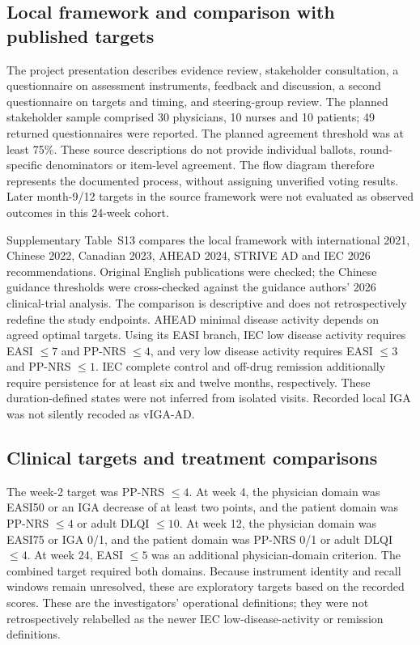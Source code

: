 \documentclass[10pt,a4paper]{article}
\begin{document}
\subsection{Local framework and comparison with published targets}
The project presentation describes evidence review, stakeholder consultation, a questionnaire on assessment instruments, feedback and discussion, a second questionnaire on targets and timing, and steering-group review. The planned stakeholder sample comprised 30 physicians, 10 nurses and 10 patients; 49 returned questionnaires were reported. The planned agreement threshold was at least 75\%. These source descriptions do not provide individual ballots, round-specific denominators or item-level agreement. The flow diagram therefore represents the documented process, without assigning unverified voting results. Later month-9/12 targets in the source framework were not evaluated as observed outcomes in this 24-week cohort.

Supplementary Table~S13 compares the local framework with international 2021, Chinese 2022, Canadian 2023, AHEAD 2024, STRIVE AD and IEC 2026 recommendations. Original English publications were checked; the Chinese guidance thresholds were cross-checked against the guidance authors' 2026 clinical-trial analysis.\citep{debruin2021t2t,zhao2022chinat2t,zhao2026t2t,yeung2023t2t,silverberg2024ahead,gkini2026strive,merola2026iec} The comparison is descriptive and does not retrospectively redefine the study endpoints. AHEAD minimal disease activity depends on agreed optimal targets. Using its EASI branch, IEC low disease activity requires EASI $\leq7$ and PP-NRS $\leq4$, and very low disease activity requires EASI $\leq3$ and PP-NRS $\leq1$. IEC complete control and off-drug remission additionally require persistence for at least six and twelve months, respectively. These duration-defined states were not inferred from isolated visits. Recorded local IGA was not silently recoded as vIGA-AD.

\subsection{Clinical targets and treatment comparisons}
The week-2 target was PP-NRS $\leq4$. At week 4, the physician domain was EASI50 or an IGA decrease of at least two points, and the patient domain was PP-NRS $\leq4$ or adult DLQI $\leq10$. At week 12, the physician domain was EASI75 or IGA 0/1, and the patient domain was PP-NRS 0/1 or adult DLQI $\leq4$. At week 24, EASI $\leq5$ was an additional physician-domain criterion. The combined target required both domains. Because instrument identity and recall windows remain unresolved, these are exploratory targets based on the recorded scores. These are the investigators' operational definitions; they were not retrospectively relabelled as the newer IEC low-disease-activity or remission definitions.\citep{merola2026iec}
\end{document}

